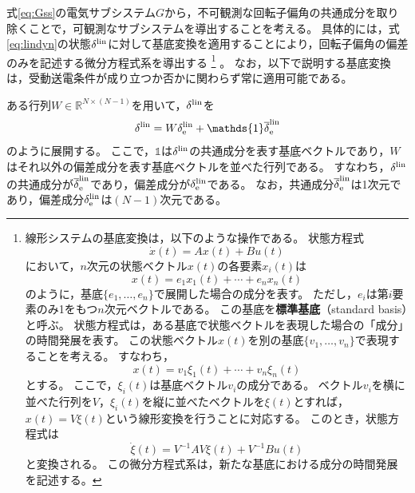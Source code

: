 \documentclass[tombow,dvipdfmx]{corona-a5-1.1}
\begin{document}
式\ref{eq:Gss}の電気サブシステム$G$から，不可観測な回転子偏角の共通成分を取り除くことで，可観測なサブシステムを導出することを考える。
具体的には，式\ref{eq:lindyn}の状態$\delta^{\rm lin}$に対して基底変換を適用することにより，回転子偏角の偏差のみを記述する微分方程式系を導出する
\footnote{
線形システムの基底変換は，以下のような操作である。
状態方程式
\[
\dot{x}(t)=Ax(t)+Bu(t)
\]
において，$n$次元の状態ベクトル$x(t)$の各要素$x_i(t)$は
\[
x(t)
=
e_1 x_1(t) + \cdots + e_n x_n(t)
\]
のように，基底$\{e_1,\ldots,e_n\}$で展開した場合の成分を表す。
ただし，$e_i$は第$i$要素のみ1をもつ$n$次元ベクトルである。
この基底を\textbf{標準基底}（standard basis）と呼ぶ。
状態方程式は，ある基底で状態ベクトルを表現した場合の「成分」の時間発展を表す。
この状態ベクトル$x(t)$を別の基底$\{v_1,\ldots,v_n\}$で表現することを考える。
すなわち，
\[
x(t)
=
v_1 \xi_1(t) + \cdots + v_n \xi_n(t)
\]
とする。
ここで，$\xi_i(t)$は基底ベクトル$v_i$の成分である。
ベクトル$v_i$を横に並べた行列を$V$，$\xi_i(t)$を縦に並べたベクトルを$\xi(t)$とすれば，
$x(t)=V\xi(t)$という線形変換を行うことに対応する。
このとき，状態方程式は
\[
\dot{\xi}(t)=V^{-1}AV \xi(t) + V^{-1} Bu(t)
\]
と変換される。
この微分方程式系は，新たな基底における成分の時間発展を記述する。
}
。
なお，以下で説明する基底変換は，受動送電条件が成り立つか否かに関わらず常に適用可能である。

ある行列$W \in \mathbb{R}^{N\times (N-1)}$を用いて，$\delta^{\rm lin}$を
\begin{align}\label{eq:batrinv}
\delta^{\rm lin}
=
W
\delta^{\rm lin}_{\rm e} +
\mathds{1}
\overline{\delta}^{\rm lin}_{\rm e}
\end{align}
のように展開する。
ここで，$\mathds{1}$は$\delta^{\rm lin}$の共通成分を表す基底ベクトルであり，$W$はそれ以外の偏差成分を表す基底ベクトルを並べた行列である。
すなわち，$\delta^{\rm lin}$の共通成分が$\overline{\delta}^{\rm lin}_{\rm e}$であり，偏差成分が$\delta^{\rm lin}_{\rm e}$である。
なお，共通成分$\overline{\delta}^{\rm lin}_{\rm e}$は1次元であり，偏差成分$\delta^{\rm lin}_{\rm e}$は$(N-1)$次元である。
\end{document}
